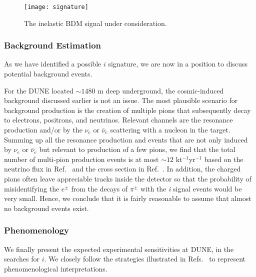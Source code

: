 \begin{figure}[t]
\centering
\texttt{[image: signature]}
\caption{\label{fig:sig} The inelastic BDM signal under consideration.}
\end{figure}

\subsubsection{Background Estimation}

As we have identified a possible $i$ signature, we are now in a position to discuss potential  background events. 



For the DUNE  located $\sim 1480$ m deep underground, the cosmic-induced background discussed earlier is not an issue. 
The most plausible scenario for background production is the creation of multiple pions that subsequently decay to electrons, positrons, and neutrinos. 
Relevant channels are the resonance production and/or  by the  $\nu_e$ or $\bar \nu_e$ scattering with a nucleon in the \lar target.
Summing up all the resonance production and  events that are not only induced by $\nu_e$ or $\bar \nu_e$ 
but relevant to production of a few pions, we find that the total number of multi-pion production events is at most $\sim 12$ kt$^{-1}$yr$^{-1}$ based on the neutrino flux in Ref.~\cite{Honda:2015fha} and the cross section in Ref.~\cite{Formaggio:2013kya}.
In addition, the charged pions often leave appreciable tracks inside the detector so that the probability of misidentifying the $e^\pm$ from the decays of $\pi^\pm$ with the \textit{i} signal events would be very small.
Hence, we conclude that it is fairly reasonable to assume that almost no background events exist.



\subsubsection{Phenomenology}\label{Sec:Pheno}

We finally present the expected experimental sensitivities at %
DUNE, in the searches for $i$. 
We closely follow the strategies illustrated in Refs.~\cite{Giudice:2017zke, Chatterjee:2018mej, Kim:2018veo} to represent phenomenological interpretations. 

